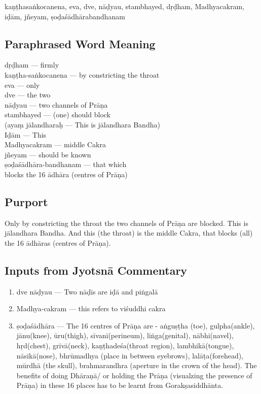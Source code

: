 kaṇṭhasaṅkocanena,  eva, dve, nāḍyau, stambhayed, dṛḍham, Madhyacakram, iḍām, jñeyam, ṣoḍaśādhārabandhanam 

\subsection*{Paraphrased Word Meaning}

\begin{multicols}{2}
dṛḍham --- firmly\\
kaṇṭha-saṅkocanena ---  by constricting the throat \\
eva --- only \\
dve --- the two \\
nāḍyau ---  two channels of Prāṇa\\
stambhayed --- (one) should block\\
(ayaṃ jālandharaḥ --- This is jālandhara Bandha)\\
Iḍām --- This \\
Madhyacakram --- middle Cakra\\
jñeyam --- should be known \\
ṣoḍaśādhāra-bandhanam --- that which \\
blocks the 16 ādhāra (centres of Prāṇa)
\end{multicols}

\subsection*{Purport}

Only by constricting the throat the two channels of Prāṇa are blocked. This is jālandhara Bandha. And this (the throat) is the middle Cakra, that blocks (all) the 16 ādhāras (centres of Prāṇa).

\subsection*{Inputs from Jyotsnā Commentary}

\begin{enumerate}
\item dve nāḍyau --- Two nāḍīs are  iḍā and piṅgalā
\item Madhya-cakram --- this refers to  viśuddhi cakra
\item ṣoḍaśādhāra --- The 16 centres of  Prāṇa  are - aṅguṣṭha (toe), gulpha(ankle), jānu(knee), ūru(thigh), sīvanī(perineum), liṅga\break (genital), nābhi(navel), hṛd(chest), grīvā(neck), kaṇṭhadeśa\break (throat region), lambhikā(tongue), nāsikā(nose), bhrūmadhya (place in between eyebrows), lalāṭa(forehead), mūrdhā (the skull), brahmarandhra (aperture in the crown of the head). The benefits of doing Dhāraṇā/ or holding the Prāṇa (visualzing the presence of Prāṇa) in these 16 places has to be learnt from Gorakṣasiddhānta.
\end{enumerate}
\newpage

